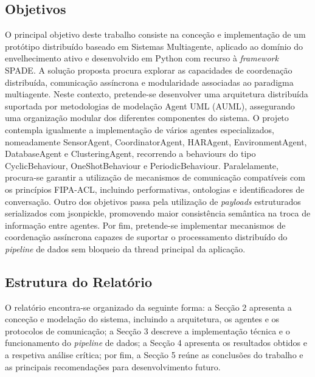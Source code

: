 \documentclass[runningheads]{llncs}
\begin{document}
\subsection{Objetivos}
O principal objetivo deste trabalho consiste na conceção e implementação de um protótipo distribuído baseado em Sistemas Multiagente, aplicado ao domínio do envelhecimento ativo e desenvolvido em Python com recurso à \textit{framework} SPADE. A solução proposta procura explorar as capacidades de coordenação distribuída, comunicação assíncrona e modularidade associadas ao paradigma multiagente.  
Neste contexto, pretende-se desenvolver uma arquitetura distribuída suportada por metodologias de modelação Agent UML (AUML), assegurando uma organização modular dos diferentes componentes do sistema. O projeto contempla igualmente a implementação de vários agentes especializados, nomeadamente SensorAgent, CoordinatorAgent, HARAgent, EnvironmentAgent, DatabaseAgent e ClusteringAgent, recorrendo a behaviours do tipo CyclicBehaviour, OneShotBehaviour e PeriodicBehaviour.  
Paralelamente, procura-se garantir a utilização de mecanismos de comunicação compatíveis com os princípios FIPA-ACL, incluindo performativas, ontologias e identificadores de conversação. Outro dos objetivos passa pela utilização de \textit{payloads} estruturados serializados com jsonpickle, promovendo maior consistência semântica na troca de informação entre agentes.  
Por fim, pretende-se implementar mecanismos de coordenação assíncrona capazes de suportar o processamento distribuído do \textit{pipeline} de dados sem bloqueio da thread principal da aplicação. 

\subsection{Estrutura do Relatório}
O relatório encontra-se organizado da seguinte forma: a Secção 2 apresenta a conceção e modelação do sistema, incluindo a arquitetura, os agentes e os protocolos de comunicação; a Secção 3 descreve a implementação técnica e o funcionamento do \textit{pipeline} de dados; a Secção 4 apresenta os resultados obtidos e a respetiva análise crítica; por fim, a Secção 5 reúne as conclusões do trabalho e as principais recomendações para desenvolvimento futuro. 
\end{document}
